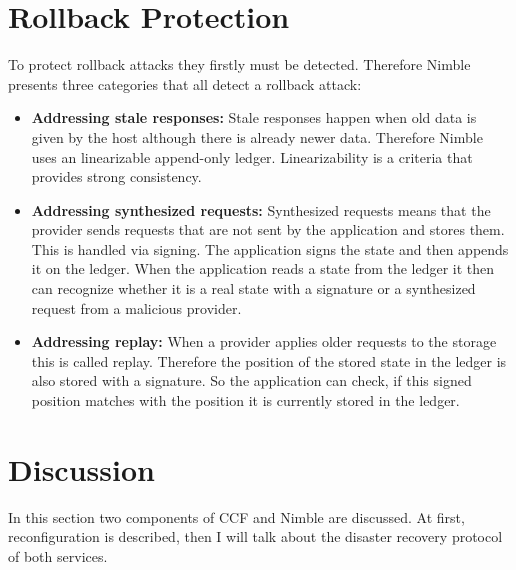 \section{Rollback Protection}

To protect rollback attacks they firstly must be detected. Therefore Nimble presents three categories that all detect a rollback attack:
\begin{itemize}
	\item \textbf{Addressing stale responses:} Stale responses happen when old data is given by the host although there is already newer data. Therefore Nimble uses an linearizable append-only ledger. Linearizability is a criteria that provides strong consistency. 
	\item \textbf{Addressing synthesized requests:} Synthesized requests means that the provider sends requests that are not sent by the application and stores them. This is handled via signing. The application signs the state and then appends it on the ledger. When the application reads a state from the ledger it then can recognize whether it is a real state with a signature or a synthesized request from a malicious provider.
	\item \textbf{Addressing replay:} When a provider applies older requests to the storage this is called replay. Therefore the position of the stored state in the ledger is also stored with a signature. So the application can check, if this signed position matches with the position it is currently stored in the ledger.
\end{itemize}

\section{Discussion}
In this section two components of CCF and Nimble are discussed. At first, reconfiguration is described, then I will talk about the disaster recovery protocol of both services.
